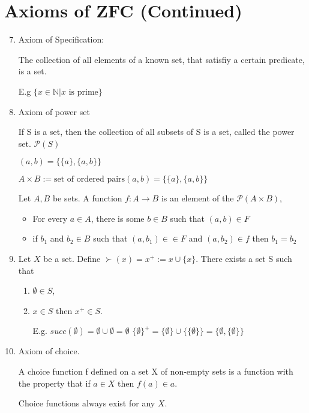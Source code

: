 \documentclass[twoside]{article}
\newcommand{\N}{\mathbb{N}}
\begin{document}

\section{Axioms of ZFC (Continued)}

\begin{enumerate}
    \setcounter{enumi}{6}
    \item Axiom of Specification:

    The collection of all elements of a known set, that satisfiy a certain predicate, is a set.

    E.g $\{x \in \N \vert x \text{ is prime}\}$
    
    \item Axiom of power set

    If S is a set, then the collection of all subsets of S is a set, called the power set. $\mathcal P (S)$

    $(a,b) = \{\{a\}, \{a, b\}\}$

    $A \times B := \text{set of ordered pairs} (a,b) = \{\{a\}, \{a, b\}\}$

    Let $A,B$ be sets. A function $f : A \rightarrow B$ is an element of the $\mathcal{P} (A \times B)$,

    \begin{itemize}
        \item For every $a \in A$, there is some $b \in B$ such that $(a,b) \in F$
        
       \item if $b_1$ and $b_2 \in B$ such that $(a,b_1) \in \in F$ and $(a, b_2) \in f$ then $b_1 = b_2$
    \end{itemize}

    \item Let $X$ be a set. Define $\succ(x) = x^{+} := x \cup \{x\}$.
    There exists a set S such that
    \begin{enumerate}
        \item $\emptyset \in S$, 
        \item $x \in S$ then $x^{+} \in S$.
        
        E.g. $succ(\emptyset) = \emptyset \cup {\emptyset} = {\emptyset}$
        $\{\emptyset\}^{+} = \{\emptyset\} \cup \{\{\emptyset\}\} = \{\emptyset, \{\emptyset\}\}$
    \end{enumerate}

    \item Axiom of choice. 

    A choice function f defined on a set X of non-empty sets is a function with the property that if $a \in X$ then $f(a) \in a$.

    Choice functions always exist for any $X$.
\end{enumerate}
\end{document}
